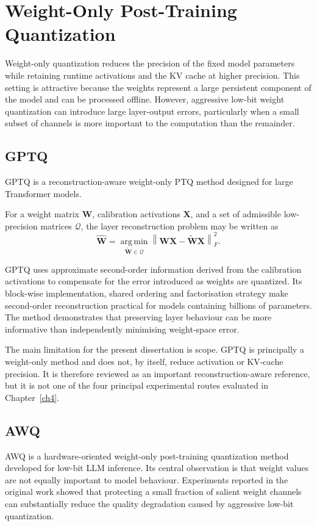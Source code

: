 \section{Weight-Only Post-Training Quantization}

Weight-only quantization reduces the precision of the fixed model
parameters while retaining runtime activations and the {KV} cache at
higher precision. This setting is attractive because the weights
represent a large persistent component of the model and can be processed
offline. However, aggressive low-bit weight quantization can introduce
large layer-output errors, particularly when a small subset of channels
is more important to the computation than the remainder.

\subsection{{GPTQ}}
GPTQ is a reconstruction-aware weight-only {PTQ} method designed for
large Transformer models\cite{frantar2023gptqaccurateposttrainingquantization}.

For a weight matrix \(\mathbf{W}\), calibration activations
\(\mathbf{X}\), and a set of admissible low-precision matrices
\(\mathcal{Q}\), the layer reconstruction problem may be written as
\begin{equation}
\widehat{\mathbf{W}}
=
\underset{\widetilde{\mathbf{W}}\in\mathcal{Q}}
{\operatorname{arg\,min}}
\left\|
\mathbf{W}\mathbf{X}
-
\widetilde{\mathbf{W}}\mathbf{X}
\right\|_{F}^{2}.
\label{eq:gptq-reconstruction-ch2}
\end{equation}

GPTQ uses approximate second-order information derived from the
calibration activations to compensate for the error introduced as
weights are quantized. Its block-wise implementation, shared ordering and
factorisation strategy make second-order reconstruction practical for
models containing billions of parameters. The method demonstrates that
preserving layer behaviour can be more informative than independently
minimising weight-space error.

The main limitation for the present dissertation is scope. GPTQ is
principally a weight-only method and does not, by itself, reduce
activation or KV-cache precision. It is therefore reviewed as an
important reconstruction-aware reference, but it is not one of the four
principal experimental routes evaluated in Chapter~\ref{ch4}.

\subsection{{AWQ}}
{AWQ} is a hardware-oriented weight-only post-training quantization
method developed for low-bit LLM inference. Its central observation is
that weight values are not equally important to model behaviour.
Experiments reported in the original work showed that protecting a
small fraction of salient weight channels can substantially reduce the
quality degradation caused by aggressive low-bit quantization.

